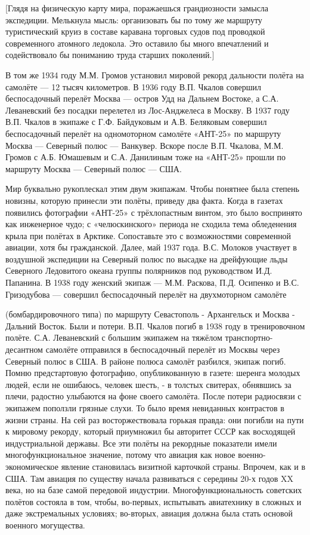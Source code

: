[Глядя на физическую карту мира, поражаешься грандиозности замысла экспедиции. Мелькнула мысль: организовать бы по тому же маршруту туристический круиз в составе каравана торговых судов под проводкой современного атомного ледокола. Это оставило бы много впечатлений и содействовало бы пониманию труда старших поколений.]

\label{175-1}
В том же 1934 году М.М. Громов установил мировой рекорд дальности полёта на самолёте — 12 тысяч километров. В 1936 году В.П. Чкалов совершил беспосадочный перелёт Москва — остров Удд на Дальнем Востоке, а С.А. Леваневский без посадки перелетел из Лос-Анджелеса в Москву. В 1937 году В.П. Чкалов в экипаже с Г.Ф. Байдуковым и А.В. Беляковым совершил беспосадочный перелёт на одномоторном самолёте «АНТ-25» по маршруту Москва — Северный полюс — Ванкувер. Вскоре после В.П. Чкалова, М.М. Громов с А.Б. Юмашевым и С.А. Данилиным тоже на «АНТ-25» прошли по маршруту Москва — Северный полюс — США. 

Мир буквально рукоплескал этим двум экипажам. Чтобы понятнее была степень новизны, которую принесли эти полёты, приведу два факта. Когда в газетах появились фотографии «АНТ-25» с трёхлопастным винтом, это было воспринято как инженерное чудо; с «челюскинского» периода не сходила тема обледенения крыла при полётах в Арктике. Сопоставьте это с возможностями современной авиации, хотя бы гражданской. 
Далее, май 1937 года. В.С. Молоков участвует в воздушной экспедиции на Северный полюс по высадке на дрейфующие льды Северного Ледовитого океана группы полярников под руководством И.Д. Папанина. В 1938 году женский экипаж — М.М. Раскова, П.Д. Осипенко и В.С. Гризодубова — совершил беспосадочный перелёт на двухмоторном самолёте

\label{176-1}
(бомбардировочного типа) по маршруту Севастополь - Архангельск и Москва - Дальний Восток. Были и потери. В.П. Чкалов погиб в 1938 году в тренировочном полёте. С.А. Леваневский с большим экипажем на тяжёлом транспортно-десантном самолёте отправился в беспосадочный перелёт из Москвы через Северный полюс в США. В районе полюса самолёт разбился, экипаж погиб.
Помню предстартовую фотографию, опубликованную в газете: шеренга молодых людей, если не ошибаюсь, человек шесть, - в толстых свитерах, обнявшись за плечи, радостно улыбаются на фоне своего самолёта. После потери радиосвязи с экипажем поползли грязные слухи. То было время невиданных контрастов в жизни страны. На сей раз восторжествовала горькая правда: они погибли на пути к мировому рекорду, который приумножил бы авторитет СССР как восходящей индустриальной державы.
Все эти полёты на рекордные показатели имели многофункциональное значение, потому что авиация как новое военно-экономическое явление становилась визитной карточкой страны. Впрочем, как и в США. Там авиация по существу начала развиваться с середины 20-х годов XX века, но на базе самой передовой индустрии. Многофункциональность советских полётов состояла в том, чтобы, во-первых, испытывать авиатехнику в сложных и даже экстремальных условиях; во-вторых, авиация должна была стать основой военного могущества.

